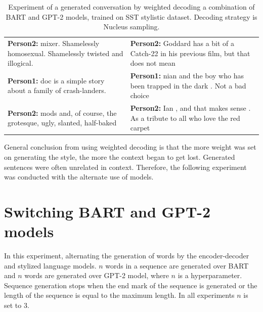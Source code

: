\begin{table}[H]
\begin{tabular}{|p{7cm}|p{7cm}|}
 \textbf{Person2:} mixer. Shamelessly homosexual. Shamelessly twisted and illogical. & \textbf{Person2:} Goddard has a bit of a Catch-22 in his previous film, but that does not mean \\
 \textbf{Person1:} doc is a simple story about a family of crash-landers. & \textbf{Person1:} nian and the boy who has been trapped in the dark .  Not a bad choice \\
 \textbf{Person2:} mods and, of course, the grotesque, ugly, slanted, half-baked & \textbf{Person2:}  Ian , and that makes sense .  As a tribute to all who love the red carpet \\
 \hline
 \end{tabular}
 \caption{Experiment of a generated conversation by weighted decoding a combination of BART and GPT-2 models, trained on SST stylistic dataset. Decoding strategy is Nucleus sampling.}
\label{tab:sst_wd_nucleus}
\end{table}

General conclusion from using weighted decoding is that the more weight was set on generating the style, the more the context began to get lost. Generated sentences were often unrelated in context. Therefore, the following experiment was conducted with the alternate use of models.

\section{Switching BART and GPT-2 models}
In this experiment, alternating the generation of words by the encoder-decoder and stylized language models. $n$ words in a sequence are generated over BART and $n$ words are generated over GPT-2 model, where $n$ is a hyperparameter. Sequence generation stops when the end mark of the sequence is generated or the length of the sequence is equal to the maximum length. In all experiments $n$ is set to 3.

